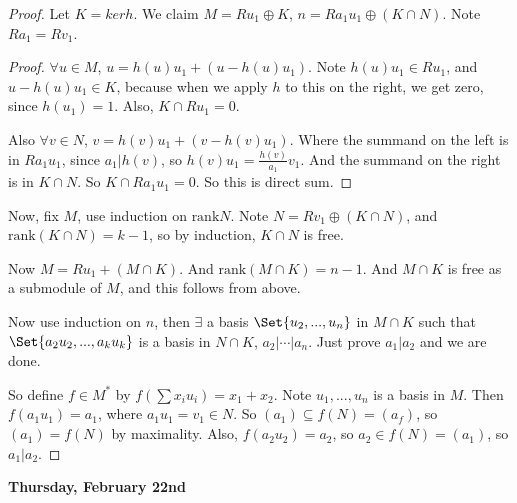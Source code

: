 \documentclass[9pt,reqno,twoside]{amsbook}
\theoremstyle{plain}
\numberwithin{section}{chapter}
\numberwithin{equation}{chapter}
\theoremstyle{definition}
\theoremstyle{remark}
\theoremstyle{plain}
\newcommand{\sub}{\subseteq}
\newcommand{\fracc}{\frac}
\newcommand{\rank}{\text{rank}}
\begin{document}
\begin{proof}
Let $K = ker h$. We claim $M = Ru_1 \oplus K$, $n = Ra_1u_1 \oplus (K \cap N)$. Note $Ra_1 = Rv_1$. 

\begin{proof}
$\forall u \in M$, $u = h(u)u_1 + (u - h(u)u_1)$. Note $h(u)u_1 \in Ru_1$, and $u - h(u)u_1 \in K$, because when we apply $h$ to this on the right, we get zero, since $h(u_1) = 1$. Also, $K \cap Ru_1 = 0$. 

Also $\forall v \in N$, $v = h(v)u_1 + (v - h(v)u_1)$. Where the summand on the left is in $Ra_1u_1$, since $a_1|h(v)$, so $h(v)u_1 = \fracc{h(v)}{a_1}v_1$. And the summand on the right is in $K \cap N$. So $K \cap Ra_1u_1 = 0$. So this is direct sum. 
\end{proof}
Now, fix $M$, use induction on $\rank N$. Note $N = Rv_1 \oplus (K \cap N)$, and $\rank(K \cap N) = k - 1$, so by induction, $K \cap N$ is free. 

Now $M = Ru_1 + (M \cap K)$. And $\rank(M \cap K) = n - 1$. And $M \cap K$ is free as a submodule of $M$, and this follows from above. 

Now use induction on $n$, then $\exists$ a basis $\Set{u_2,...,u_n}$ in $M\cap K$ such that $\Set{a_2u_2,...,a_ku_k}$ is a basis in $N \cap K$, $a_2|\cdots|a_n$. Just prove $a_1|a_2$ and we are done. 

So define $f \in M^*$ by $f(\sum x_iu_i) = x_1 + x_2$. Note $u_1,...,u_n$ is a basis in $M$. Then $f(a_1u_1) = a_1$, where $a_1u_1 = v_1 \in N$. So $(a_1) \sub f(N) = (a_f)$, so $(a_1) = f(N)$ by maximality. Also, $f(a_2u_2) = a_2$, so $a_2 \in f(N) = (a_1)$, so $a_1|a_2$. 
\end{proof}

\textbf{Thursday, February 22nd}
\end{document}
